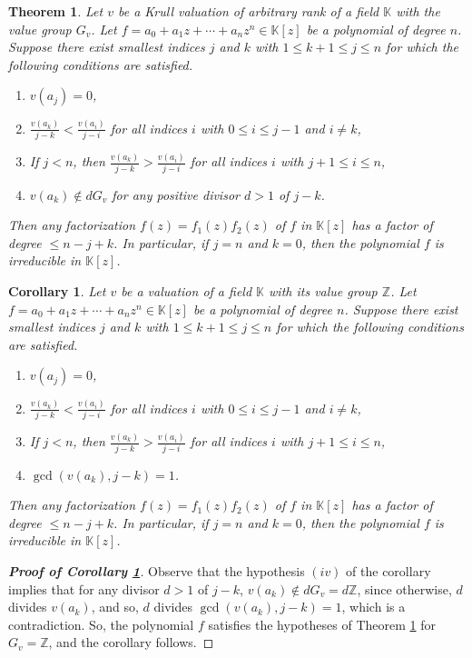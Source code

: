 \documentclass[10pt,a4paper]{amsart}
\newcommand{\K}{\mathbb{K}}
\newtheorem{theorem}{Theorem}
\newtheorem{corollary}{Corollary}
\begin{document}
\begin{theorem}\label{th:1}
Let $v$ be a Krull valuation of arbitrary rank of a field $\K$ with the value group $G_v$. Let $f=a_0+a_1 z+\cdots+a_n z^n \in \K[z]$ be a polynomial of degree $n$. Suppose there exist smallest indices $j$ and $k$ with $1\leq k+1\leq j\leq n$ for which the following conditions are satisfied.
\begin{enumerate}[label=$(\roman*)$]
		\item[$(i)$] $v(a_j)=0$,
\item[$(ii)$] $\frac{v(a_k)}{j-k}<\frac{v(a_i)}{j-i}$ for all indices $i$ with $0\leq i\leq j-1$ and $i\neq k$,
\item[(iii)] If $j<n$, then $\frac{v(a_k)}{j-k}>\frac{v(a_i)}{j-i}$ for all indices $i$ with $j+1\leq i\leq n$,
\item[$(iv)$] $v(a_k)\notin dG_v$ for any positive divisor $d>1$ of $j-k$.
	\end{enumerate}
Then any factorization $f(z)=f_1(z)f_2(z)$ of $f$ in $\K[z]$ has a factor of degree $\leq n-j+k$. In particular, if $j=n$ and $k=0$, then the polynomial $f$ is irreducible in $\K[z]$.
\end{theorem}

\begin{corollary}\label{c:1}
Let $v$ be a valuation of a field $\K$ with its value group $\mathbb{Z}$. Let $f=a_0+a_1z+\cdots +a_nz^n \in \K[z]$ be a polynomial of degree $n$. Suppose there exist smallest indices $j$ and $k$ with $1\leq k+1\leq j\leq n$ for which the following conditions are satisfied.
	\begin{enumerate}[label=$(\roman*)$]
		\item $v(a_j)=0$,
		\item $\frac{v(a_k)}{j-k}<\frac{v(a_i)}{j-i}$ for all indices $i$ with $0\leq i\leq j-1$ and $i\neq k$,
		\item If $j<n$, then $\frac{v(a_k)}{j-k}>\frac{v(a_i)}{j-i}$ for all indices $i$ with $j+1\leq i\leq n$,
		\item $\gcd(v(a_k),j-k)=1$.
	\end{enumerate}	
	Then any factorization $f(z)=f_1(z)f_2(z)$ of $f$ in $\K[z]$ has a factor of degree $\leq n-j+k$. In particular, if $j=n$ and $k=0$, then the polynomial $f$ is irreducible in $\K[z]$.
\end{corollary}

\begin{proof}[\bf Proof of Corollary \ref{c:1}]
Observe that the hypothesis $(iv)$ of the corollary implies that for any divisor $d>1$ of $j-k$, $v(a_k)\not\in dG_v=d\mathbb{Z}$, since otherwise, $d$ divides $v(a_k)$, and so, $d$ divides $\gcd(v(a_k),j-k)=1$, which is a contradiction. So, the polynomial $f$ satisfies the hypotheses of Theorem \ref{th:1} for $G_v=\mathbb{Z}$, and the corollary follows.
\end{proof}
\end{document}
